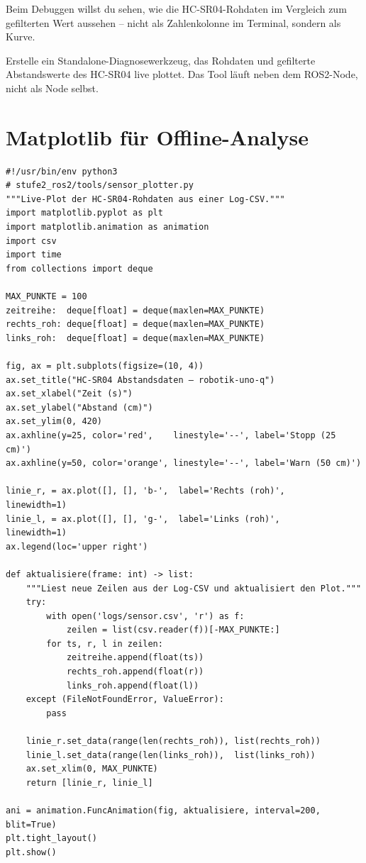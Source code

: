 Beim Debuggen willst du sehen, wie die HC-SR04-Rohdaten
im Vergleich zum gefilterten Wert aussehen --
nicht als Zahlenkolonne im Terminal,
sondern als Kurve.

\begin{aufgabeBox}
Erstelle ein Standalone-Diagnosewerkzeug, das Rohdaten und gefilterte
Abstandswerte des HC-SR04 live plottet.
Das Tool läuft neben dem ROS2-Node, nicht als Node selbst.
\end{aufgabeBox}

\section{Matplotlib für Offline-Analyse}

\begin{lstlisting}
#!/usr/bin/env python3
# stufe2_ros2/tools/sensor_plotter.py
"""Live-Plot der HC-SR04-Rohdaten aus einer Log-CSV."""
import matplotlib.pyplot as plt
import matplotlib.animation as animation
import csv
import time
from collections import deque

MAX_PUNKTE = 100
zeitreihe:  deque[float] = deque(maxlen=MAX_PUNKTE)
rechts_roh: deque[float] = deque(maxlen=MAX_PUNKTE)
links_roh:  deque[float] = deque(maxlen=MAX_PUNKTE)

fig, ax = plt.subplots(figsize=(10, 4))
ax.set_title("HC-SR04 Abstandsdaten – robotik-uno-q")
ax.set_xlabel("Zeit (s)")
ax.set_ylabel("Abstand (cm)")
ax.set_ylim(0, 420)
ax.axhline(y=25, color='red',    linestyle='--', label='Stopp (25 cm)')
ax.axhline(y=50, color='orange', linestyle='--', label='Warn (50 cm)')

linie_r, = ax.plot([], [], 'b-',  label='Rechts (roh)',      linewidth=1)
linie_l, = ax.plot([], [], 'g-',  label='Links (roh)',       linewidth=1)
ax.legend(loc='upper right')

def aktualisiere(frame: int) -> list:
    """Liest neue Zeilen aus der Log-CSV und aktualisiert den Plot."""
    try:
        with open('logs/sensor.csv', 'r') as f:
            zeilen = list(csv.reader(f))[-MAX_PUNKTE:]
        for ts, r, l in zeilen:
            zeitreihe.append(float(ts))
            rechts_roh.append(float(r))
            links_roh.append(float(l))
    except (FileNotFoundError, ValueError):
        pass

    linie_r.set_data(range(len(rechts_roh)), list(rechts_roh))
    linie_l.set_data(range(len(links_roh)),  list(links_roh))
    ax.set_xlim(0, MAX_PUNKTE)
    return [linie_r, linie_l]

ani = animation.FuncAnimation(fig, aktualisiere, interval=200, blit=True)
plt.tight_layout()
plt.show()
\end{lstlisting}

